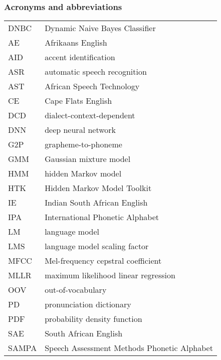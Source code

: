 \newpage
\subsubsection*{Acronyms and abbreviations}

\begingroup
\renewcommand{\arraystretch}{1.2}
\begin{tabular}{@{}p{2.5cm} l}
    DNBC    & Dynamic Naive Bayes Classifier \\
    AE      & Afrikaans English \\
    AID     & accent identification \\
    ASR     & automatic speech recognition \\
    AST     & African Speech Technology \\
    CE      & Cape Flats English \\
    DCD     & dialect-context-dependent \\
    DNN		& deep neural network \\
    G2P     & grapheme-to-phoneme \\
    GMM     & Gaussian mixture model \\
    HMM     & hidden Markov model \\
    HTK     & Hidden Markov Model Toolkit \\
    IE      & Indian South African English \\
    IPA     & International Phonetic Alphabet \\
    LM      & language model \\
    LMS     & language model scaling factor \\
    MFCC    & Mel-frequency cepstral coefficient \\
    MLLR    & maximum likelihood linear regression \\
    OOV     & out-of-vocabulary \\
    PD      & pronunciation dictionary \\
    PDF     & probability density function \\
    SAE     & South African English \\
    SAMPA   & Speech Assessment Methods Phonetic Alphabet \\
\end{tabular}
\endgroup
